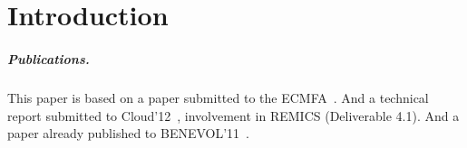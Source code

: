 \chapter{Introduction}


\paragraph{Publications.}

This paper is based on a paper submitted to the ECMFA~\cite{ecmfa4clouda}.
And a technical report submitted to Cloud'12~\cite{remics_4_1}, involvement in REMICS (Deliverable 4.1).
And a paper already published to BENEVOL'11~\cite{mosser-brandtzæg-etal:2011}.
